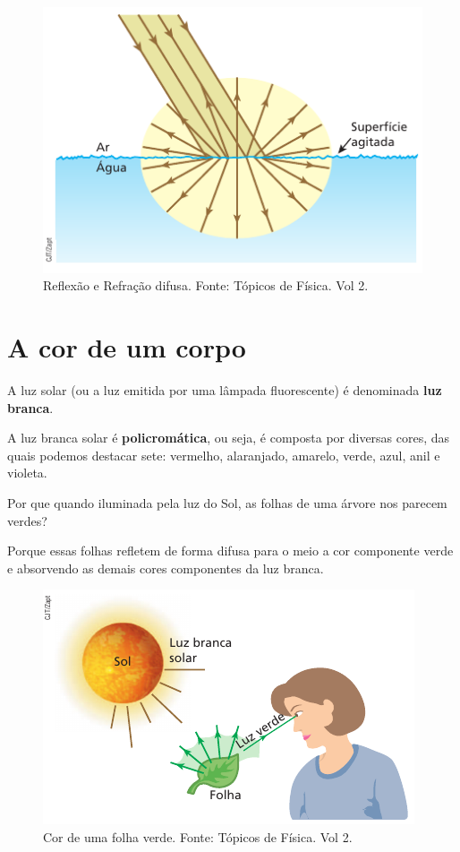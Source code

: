 \documentclass[11pt,twocolumn,oneside]{article}
\begin{document}
\begin{figure}[h]{}
\centering\includegraphics[width=2.5truein]{img9.png}
\caption{Reflexão e Refração difusa. Fonte: Tópicos de Física. Vol 2.}
\centering
\end{figure}

\hypertarget{x-a-cor-de-um-corpo}{\section{A cor de um corpo}}
A luz solar (ou a luz emitida por uma lâmpada fluorescente) é denominada \textbf{luz branca}.


A luz branca solar é \textbf{policromática}, ou seja, é composta por diversas cores, das quais podemos destacar sete: vermelho, alaranjado, amarelo, verde, azul, anil e violeta.


Por que quando iluminada pela luz do Sol, as folhas de uma árvore nos parecem verdes?


Porque essas folhas refletem de forma difusa para o meio a cor componente verde e absorvendo as demais cores componentes da luz branca.


\begin{figure}[h]{}
\centering\includegraphics[width=2.5truein]{img10.png}
\caption{Cor de uma folha verde. Fonte: Tópicos de Física. Vol 2.}
\centering
\end{figure}
\end{document}
